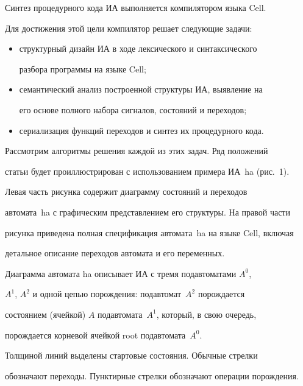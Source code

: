       Синтез процедурного кода ИА выполняется компилятором языка Cell. 


Для достижения этой цели компилятор решает следующие задачи:


      \begin{itemize}


      \item структурный дизайн ИА в ходе лексического и синтаксического 


разбора программы на языке Cell;


      \item семантический анализ построенной структуры ИА, выявление на 


его основе полного набора сигналов, состояний и переходов;


      \item сериализация функций переходов и синтез их процедурного кода.


      \end{itemize}


      


      Рассмотрим алгоритмы решения каждой из этих задач. Ряд положений 


статьи будет проиллюстрирован с использованием примера ИА~ha (рис.~1).


      


      Левая часть рисунка содержит диаграмму состояний и переходов 


автомата~ha с графическим представлением его структуры. На правой части 


рисунка приведена полная спецификация автомата~ha на языке Cell, включая 


детальное описание переходов автомата и его переменных.


      


      Диаграмма автомата ha описывает ИА с тремя подавтоматами $A^0$, 


$A^1$, $A^2$ и одной цепью порождения: подавтомат~$A^2$ порождается 


состоянием (ячейкой) $A$ подавтомата~$A^1$, который, в свою очередь, 


порождается корневой ячейкой root подавтомата~$A^0$. 


Толщиной линий выделены стартовые состояния. Обычные стрелки 


обозначают переходы. Пунктирные стрелки обозначают операции по\-рож\-дения.


